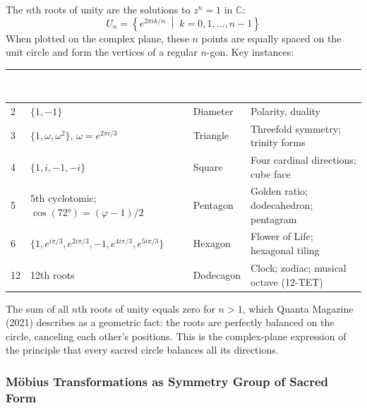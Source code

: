 \documentclass[11pt,letterpaper]{article}
\newcommand{\tableheader}[1]{\textbf{\sffamily\textcolor{white}{#1}}}
\begin{document}
The $n$th roots of unity are the solutions to $z^n = 1$ in $\mathbb{C}$:
\[
U_n = \left\{e^{2\pi ik/n} \;\middle|\; k = 0, 1, \ldots, n-1\right\}
\]
When plotted on the complex plane, these $n$ points are equally spaced on the unit circle and form the vertices of a regular $n$-gon. Key instances:

\begin{center}
\begin{tabularx}{\textwidth}{C{1.5cm}L{4.5cm}L{3cm}X}
\toprule
{}
\tableheader{$n$} & \tableheader{Roots (explicit)} & \tableheader{Polygon} & \tableheader{Sacred Form Connection} \\
 & $\{1, -1\}$ & Diameter & Polarity, duality \\
3 & $\{1, \omega, \omega^2\}$, $\omega = e^{2\pi i/3}$ & Triangle & Threefold symmetry; trinity forms \\
4 & $\{1, i, -1, -i\}$ & Square & Four cardinal directions; cube face \\
5 & $5$th cyclotomic; $\cos(72°) = (\varphi-1)/2$ & Pentagon & Golden ratio; dodecahedron; pentagram \\
6 & $\{1, e^{i\pi/3}, e^{2i\pi/3}, -1, e^{4i\pi/3}, e^{5i\pi/3}\}$ & Hexagon & Flower of Life; hexagonal tiling \\
12 & 12th roots & Dodecagon & Clock; zodiac; musical octave (12-TET) \\
\bottomrule
\end{tabularx}
\end{center}

The sum of all $n$th roots of unity equals zero for $n > 1$, which Quanta Magazine (2021) describes as a geometric fact: the roots are perfectly balanced on the circle, canceling each other's positions. This is the complex-plane expression of the principle that every sacred circle balances all its directions.

\subsubsection{M\"{o}bius Transformations as Symmetry Group of Sacred Form}
\end{document}
